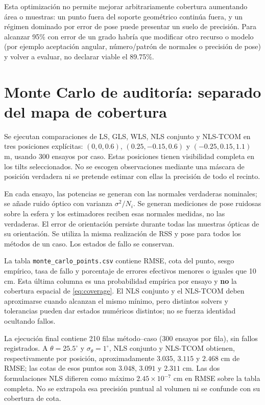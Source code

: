 \documentclass[11pt,a4paper]{article}
\begin{document}
Esta optimización no permite mejorar arbitrariamente cobertura aumentando área o muestras: un punto fuera del soporte geométrico continúa fuera, y un régimen dominado por error de pose puede presentar un suelo de precisión. Para alcanzar 95\% con error de un grado habría que modificar otro recurso o modelo (por ejemplo aceptación angular, número/patrón de normales o precisión de pose) y volver a evaluar, no declarar viable el 89.75\%.

\section{Monte Carlo de auditoría: separado del mapa de cobertura}
Se ejecutan comparaciones de LS, GLS, WLS, NLS conjunto y NLS-TCOM en tres posiciones explícitas: $(0,0,0.6)$, $(0.25,-0.15,0.6)$ y $(-0.25,0.15,1.1)$ m, usando 300 ensayos por caso. Estas posiciones tienen visibilidad completa en los tilts seleccionados. No se escogen observaciones mediante una máscara de posición verdadera ni se pretende estimar con ellas la precisión de todo el recinto.

En cada ensayo, las potencias se generan con las normales verdaderas nominales; se añade ruido óptico con varianza $\sigma^2/N_i$. Se generan mediciones de pose ruidosas sobre la esfera y los estimadores reciben esas normales medidas, no las verdaderas. El error de orientación persiste durante todas las muestras ópticas de su orientación. Se utiliza la misma realización de RSS y pose para todos los métodos de un caso. Los estados de fallo se conservan.

La tabla \texttt{monte\_carlo\_points.csv} contiene RMSE, cota del punto, sesgo empírico, tasa de fallo y porcentaje de errores efectivos menores o iguales que 10 cm. Esta última columna es una probabilidad empírica por ensayo y \textbf{no} la cobertura espacial de \eqref{eq:coverage}. El NLS conjunto y el NLS-TCOM deben aproximarse cuando alcanzan el mismo mínimo, pero distintos solvers y tolerancias pueden dar estados numéricos distintos; no se fuerza identidad ocultando fallos.

La ejecución final contiene 210 filas método--caso (300 ensayos por fila), sin fallos registrados. A $\theta=25.5^\circ$ y $\sigma_\theta=1^\circ$, NLS conjunto y NLS-TCOM obtienen, respectivamente por posición, aproximadamente $3.035$, $3.115$ y $2.468$ cm de RMSE; las cotas de esos puntos son $3.048$, $3.091$ y $2.311$ cm. Las dos formulaciones NLS difieren como máximo $2.45\times10^{-7}$ cm en RMSE sobre la tabla completa. No se extrapola esa precisión puntual al volumen ni se confunde con su cobertura de cota.
\end{document}
